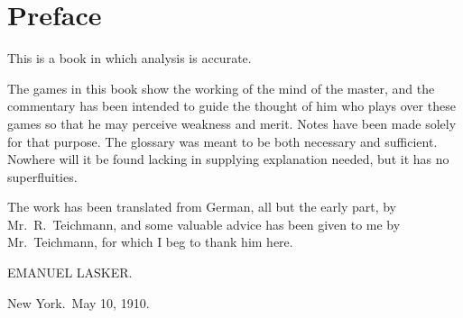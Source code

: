 \chapter{Preface}

This is a book in which analysis is accurate. 

The games in this book show the working of the mind of the master, and the commentary has been intended to guide the thought of him who plays over these games so that he may perceive weakness and merit. Notes have been made solely for that purpose. The glossary was meant to be both necessary and sufficient. Nowhere will it be found lacking in supplying explanation needed, but it has no superfluities.

The work has been translated from German, all but the early part, by Mr.~R.~Teichmann, and some valuable advice has been given to me by Mr.~Teichmann, for which I beg to thank him here.

\begin{flushright}
EMANUEL LASKER.
\end{flushright}

\noindent New York.~May 10, 1910.